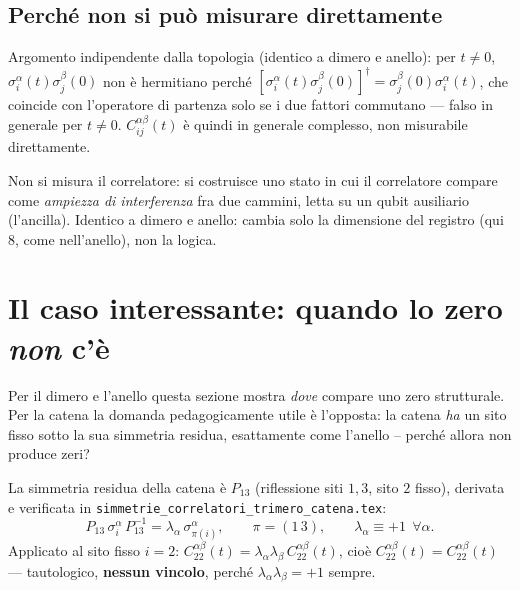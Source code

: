 \documentclass[11pt,a4paper]{article}
\begin{document}
\subsection{Perché non si può misurare direttamente}

Argomento indipendente dalla topologia (identico a dimero e anello): per $t\neq0$,
$\sigma_i^\alpha(t)\sigma_j^\beta(0)$ non è hermitiano perché
$[\sigma_i^\alpha(t)\sigma_j^\beta(0)]^\dagger=\sigma_j^\beta(0)\sigma_i^\alpha(t)$, che coincide
con l'operatore di partenza solo se i due fattori commutano --- falso in generale per $t\neq0$.
$C_{ij}^{\alpha\beta}(t)$ è quindi in generale complesso, non misurabile direttamente.

\begin{ideabox}
Non si misura il correlatore: si costruisce uno stato in cui il correlatore compare come
\emph{ampiezza di interferenza} fra due cammini, letta su un qubit ausiliario (l'ancilla). Identico
a dimero e anello: cambia solo la dimensione del registro (qui $8$, come nell'anello), non la
logica.
\end{ideabox}

\section{Il caso interessante: quando lo zero \emph{non} c'è}
\label{sec:caso2}

Per il dimero e l'anello questa sezione mostra \emph{dove} compare uno zero strutturale. Per la
catena la domanda pedagogicamente utile è l'opposta: la catena \emph{ha} un sito fisso sotto la
sua simmetria residua, esattamente come l'anello -- perché allora non produce zeri?

La simmetria residua della catena è $P_{13}$ (riflessione siti $1,3$, sito $2$ fisso), derivata e
verificata in \texttt{simmetrie\_correlatori\_trimero\_catena.tex}:
\begin{equation}
P_{13}\,\sigma_i^\alpha\,P_{13}^{-1}=\lambda_\alpha\,\sigma_{\pi(i)}^\alpha,
\qquad\pi=(1\,3),\qquad\lambda_\alpha\equiv+1\ \ \forall\alpha.
\end{equation}
Applicato al sito fisso $i=2$: $C_{22}^{\alpha\beta}(t)=\lambda_\alpha\lambda_\beta\,
C_{22}^{\alpha\beta}(t)$, cioè $C_{22}^{\alpha\beta}(t)=C_{22}^{\alpha\beta}(t)$ --- tautologico,
\textbf{nessun vincolo}, perché $\lambda_\alpha\lambda_\beta=+1$ sempre.
\end{document}
